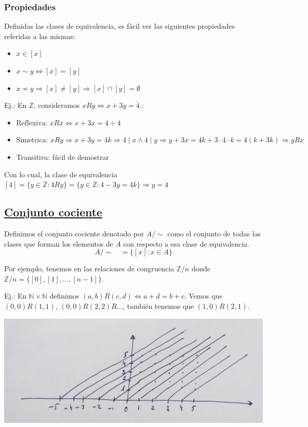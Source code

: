 \documentclass[10pt,a4paper,openright]{book}
\begin{document}
\subsubsection*{Propiedades}
Definidas las clases de equivalencia, es fácil ver las siguientes propiedades referidas a las mismas:
\begin{itemize}
\item $x\in [x]$
\item $x\sim y\Leftrightarrow [x]=[y]$
\item $x\nsim y\Rightarrow [x]\neq [y]\Rightarrow [x]\cap [y]=\emptyset$
\end{itemize}

Ej.: En $\mathbb Z$, consideramos $xRy\Leftrightarrow x+3y=\dot 4$.:
\begin{itemize}
\item $\mbox{Reflexiva: } xRx\Leftrightarrow x+3x=4 \div 4$
\item $\mbox{Simetrica: } xRy\Rightarrow x+3y=4k \Rightarrow 4\mid x \wedge 4\mid y\Rightarrow y+3x=4k+3\cdot 4\cdot k=4(k+3k)\Rightarrow yRx$

\item Transitiva: fácil de demostrar
\end{itemize}
Con lo cual, la clase de equivalencia $[4]=\{y\in \mathbb Z: 4Ry\}=\{y\in \mathbb Z: 4-3y=4k\}\Rightarrow y=\dot{4}$

\subsection*{\underline{Conjunto cociente}}
Definimos el conjunto cociente denotado por $A/\sim$ como el conjunto de todas las clases que forman los elementos de $A$ con respecto a esa clase de equivalencia.
$$A/\sim\quad =\{[x]: x\in A\}$$

Por ejemplo, tenemos en las relaciones de congruencia $\mathbb Z/n$ donde $\mathbb Z/n=\{[0], [1], ...,[n-1]\}$.\par

Ej.: En $\mathbb N\times \mathbb N$ definimos $(a,b)R(c,d)\Leftrightarrow a+d=b+c$. Vemos que $(0,0)R(1,1)$, $(0,0)R(2,2)R...$, también tenemos que $(1,0)R(2,1)$.

\begin{center}
\includegraphics[scale=0.35]{definicion enteros}
\end{center}
\end{document}

